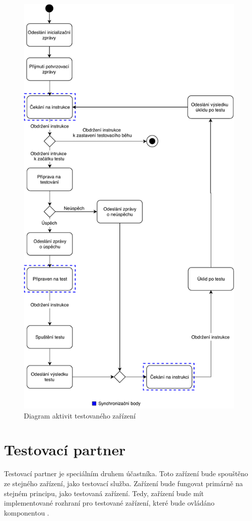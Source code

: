 \begin{figure}
    \centering 
    \includegraphics[height=0.98\textheight]{assets/img/activitydiagramdevice.pdf}
    \caption{Diagram aktivit testovaného zařízení}
    \label{fig:act_diag_device}
\end{figure}


\section{Testovací partner}
Testovací partner je speciálním druhem účastníka. Toto zařízení bude spouštěno ze stejného zařízení, jako testovací služba. Zařízení bude fungovat primárně na stejném principu, jako testovaná zařízení. Tedy, zařízení bude mít implementované rozhraní pro testované zařízení, které bude ovládáno komponentou . 

